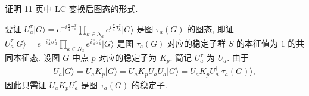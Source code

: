 \documentclass{assignment}
\begin{document}
\begin{prob}
    证明 11 页中 LC 变换后图态的形式.
\end{prob}
\begin{pf}
    要证 $U_a^{\tau}\lvert G\rangle=e^{-i\frac{\pi}{4}\sigma_a^x}\prod_{k\in N_a}e^{i\frac{\pi}{4}\sigma_k^z}\lvert G\rangle$ 是图 $\tau_a(G)$ 的图态, 即证 $U_a^{\tau}\lvert G\rangle=e^{-i\frac{\pi}{4}\sigma_a^x}\prod_{k\in N_z}e^{i\frac{\pi}{4}\sigma_k^z}\lvert G\rangle$ 是图 $\tau_a(G)$ 对应的稳定子群 $S$ 的本征值为 $1$ 的共同本征态. 设图 $G$ 中点 $p$ 对应的稳定子为 $K_p$. 简记 $U_a^{\tau}$ 为 $U_a$. 由于
    \begin{align}
        U_a\lvert G\rangle=U_aK_p\lvert G\rangle=U_aK_pU_a^{\dagger}U_a\lvert G\rangle=U_aK_pU_a^{\dagger}\lvert\tau_a(G)\rangle,
    \end{align}
    因此只需证 $U_aK_pU_a^{\dagger}$ 是图 $\tau_a(G)$ 的稳定子.


\end{pf}
\end{document}
